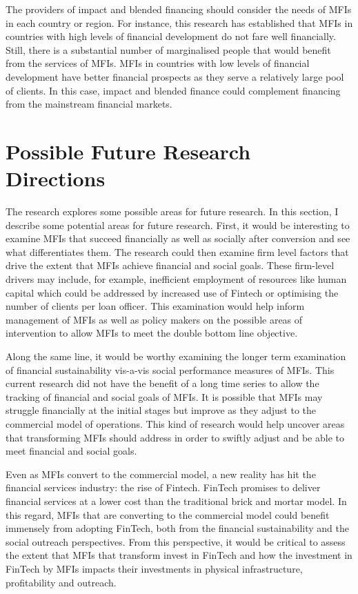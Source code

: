 \documentclass[a4paper, nobind]{templates/ociamthesis}
\begin{document}
The providers of impact and blended financing should consider the needs of MFIs in each country or region. For instance, this research has established that MFIs in countries with high levels of financial development do not fare well financially. Still, there is a substantial number of marginalised people that would benefit from the services of MFIs. MFIs in countries with low levels of financial development have better financial prospects as they serve a relatively large pool of clients. In this case, impact and blended finance could complement financing from the mainstream financial markets.

\hypertarget{possible-future-research-directions}{%
\section{Possible Future Research Directions}\label{possible-future-research-directions}}

The research explores some possible areas for future research. In this section, I describe some potential areas for future research. First, it would be interesting to examine MFIs that succeed financially as well as socially after conversion and see what differentiates them. The research could then examine firm level factors that drive the extent that MFIs achieve financial and social goals. These firm-level drivers may include, for example, inefficient employment of resources like human capital which could be addressed by increased use of Fintech or optimising the number of clients per loan officer. This examination would help inform management of MFIs as well as policy makers on the possible areas of intervention to allow MFIs to meet the double bottom line objective.

Along the same line, it would be worthy examining the longer term examination of financial sustainability vis-a-vis social performance measures of MFIs. This current research did not have the benefit of a long time series to allow the tracking of financial and social goals of MFIs. It is possible that MFIs may struggle financially at the initial stages but improve as they adjust to the commercial model of operations. This kind of research would help uncover areas that transforming MFIs should address in order to swiftly adjust and be able to meet financial and social goals.

Even as MFIs convert to the commercial model, a new reality has hit the financial services industry: the rise of Fintech. FinTech promises to deliver financial services at a lower cost than the traditional brick and mortar model. In this regard, MFIs that are converting to the commercial model could benefit immensely from adopting FinTech, both from the financial sustainability and the social outreach perspectives. From this perspective, it would be critical to assess the extent that MFIs that transform invest in FinTech and how the investment in FinTech by MFIs impacts their investments in physical infrastructure, profitability and outreach.
\end{document}
